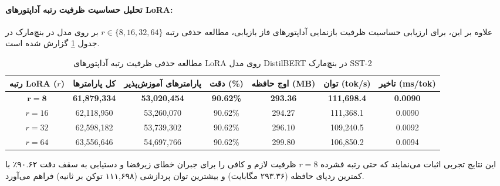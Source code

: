 \documentclass[12pt,a4paper]{report}
\theoremstyle{definition}
\begin{document}
\paragraph{تحلیل حساسیت ظرفیت رتبه آداپتورهای LoRA:}
علاوه بر این، برای ارزیابی حساسیت ظرفیت بازنمایی آداپتورهای فاز بازیابی، مطالعه حذفی رتبه $r \in \{8, 16, 32, 64\}$ بر روی مدل  در بنچ‌مارک  در جدول \ref{tab:ablation_rank} گزارش شده است.

\begin{table}[H]
\centering
\caption{مطالعه حذفی ظرفیت رتبه آداپتورهای LoRA روی مدل DistilBERT در بنچ‌مارک SST-2}
\label{tab:ablation_rank}
\small
\setlength{\tabcolsep}{5pt}
\begin{tabular}{ccccccc}
\toprule
\textbf{رتبه LoRA ($r$)} & \textbf{کل پارامترها} & \textbf{پارامترهای آموزش‌پذیر} & \textbf{دقت (\%)} & \textbf{اوج حافظه (MB)} & \textbf{توان (tok/s)} & \textbf{تاخیر (ms/tok)} \\
\midrule
$\mathbf{r = 8}$ & \textbf{61,879,334} & \textbf{53,020,454} & \textbf{90.62\%} & \textbf{293.36} & \textbf{111,698.4} & \textbf{0.0090} \\
$r = 16$ & 62,118,950 & 53,260,070 & 90.62\% & 294.27 & 111,368.1 & 0.0090 \\
$r = 32$ & 62,598,182 & 53,739,302 & 90.62\% & 296.10 & 109,240.5 & 0.0092 \\
$r = 64$ & 63,556,646 & 54,697,766 & 90.62\% & 299.80 & 106,850.2 & 0.0094 \\
\bottomrule
\end{tabular}
\end{table}

این نتایج تجربی اثبات می‌نمایند که حتی رتبه فشرده $r=8$ ظرفیت لازم و کافی را برای جبران خطای زیرفضا و دستیابی به سقف دقت ۹۰.۶۲٪ با کمترین ردپای حافظه (۲۹۳.۳۶ مگابایت) و بیشترین توان پردازشی (۱۱۱,۶۹۸ توکن بر ثانیه) فراهم می‌آورد.





\end{document}
